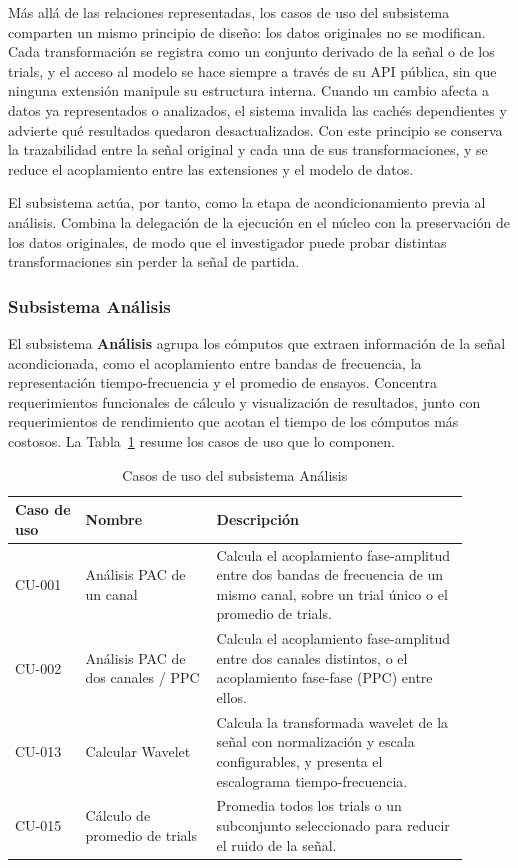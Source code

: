 \documentclass[11pt,a4paper]{article}
\DeclareRobustCommand{\_}{\textunderscore\allowbreak}
\begin{document}
M\'as all\'a de las relaciones representadas, los casos de uso del subsistema comparten un mismo principio de dise\~no: los datos originales no se modifican. Cada transformaci\'on se registra como un conjunto derivado de la se\~nal o de los trials, y el acceso al modelo se hace siempre a trav\'es de su API p\'ublica, sin que ninguna extensi\'on manipule su estructura interna. Cuando un cambio afecta a datos ya representados o analizados, el sistema invalida las cach\'es dependientes y advierte qu\'e resultados quedaron desactualizados. Con este principio se conserva la trazabilidad entre la se\~nal original y cada una de sus transformaciones, y se reduce el acoplamiento entre las extensiones y el modelo de datos.

El subsistema act\'ua, por tanto, como la etapa de acondicionamiento previa al an\'alisis. Combina la delegaci\'on de la ejecuci\'on en el n\'ucleo con la preservaci\'on de los datos originales, de modo que el investigador puede probar distintas transformaciones sin perder la se\~nal de partida.

\subsubsection{Subsistema An\'alisis}

El subsistema \textbf{An\'alisis} agrupa los c\'omputos que extraen informaci\'on de la se\~nal acondicionada, como el acoplamiento entre bandas de frecuencia, la representaci\'on tiempo-frecuencia y el promedio de ensayos. Concentra requerimientos funcionales de c\'alculo y visualizaci\'on de resultados, junto con requerimientos de rendimiento que acotan el tiempo de los c\'omputos m\'as costosos. La Tabla~\ref{tab:cu_analisis} resume los casos de uso que lo componen.

\begin{table}[H]
    \centering
    \caption{Casos de uso del subsistema An\'alisis}
    \label{tab:cu_analisis}
    \begin{tabular}{|p{0.14\linewidth}|p{0.26\linewidth}|p{0.50\linewidth}|}
        \hline
        \textbf{Caso de uso} & \textbf{Nombre} & \textbf{Descripci\'on} \\
        \hline
        CU-001 & An\'alisis PAC de un canal & Calcula el acoplamiento fase-amplitud entre dos bandas de frecuencia de un mismo canal, sobre un trial \'unico o el promedio de trials. \\
        \hline
        CU-002 & An\'alisis PAC de dos canales / PPC & Calcula el acoplamiento fase-amplitud entre dos canales distintos, o el acoplamiento fase-fase (PPC) entre ellos. \\
        \hline
        CU-013 & Calcular Wavelet & Calcula la transformada wavelet de la se\~nal con normalizaci\'on y escala configurables, y presenta el escalograma tiempo-frecuencia. \\
        \hline
        CU-015 & C\'alculo de promedio de trials & Promedia todos los trials o un subconjunto seleccionado para reducir el ruido de la se\~nal. \\
        \hline
    \end{tabular}
\end{table}
\end{document}

